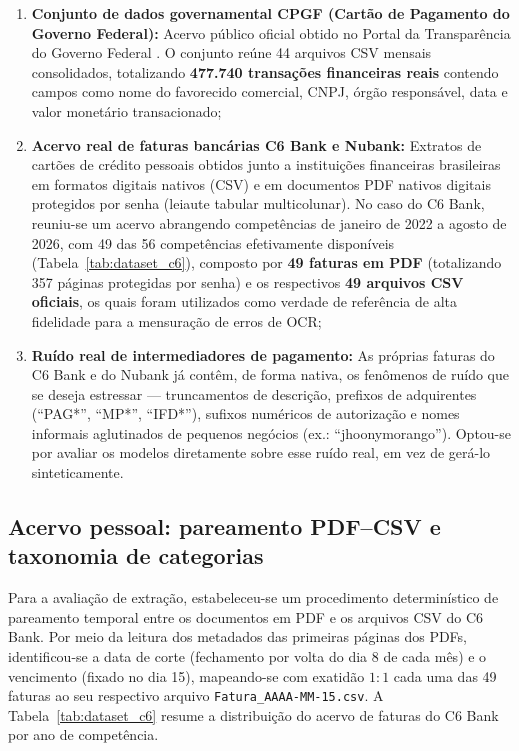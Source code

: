 \begin{enumerate}
	\item \textbf{Conjunto de dados governamental CPGF (Cartão de Pagamento do Governo Federal):} Acervo público oficial obtido no Portal da Transparência do Governo Federal \cite{brasilcpgf}. O conjunto reúne 44 arquivos CSV mensais consolidados, totalizando \textbf{477.740 transações financeiras reais} contendo campos como nome do favorecido comercial, CNPJ, órgão responsável, data e valor monetário transacionado;
	\item \textbf{Acervo real de faturas bancárias C6 Bank e Nubank:} Extratos de cartões de crédito pessoais obtidos junto a instituições financeiras brasileiras em formatos digitais nativos (CSV) e em documentos PDF nativos digitais protegidos por senha (leiaute tabular multicolunar). No caso do C6 Bank, reuniu-se um acervo abrangendo competências de janeiro de 2022 a agosto de 2026, com 49 das 56 competências efetivamente disponíveis (Tabela~\ref{tab:dataset_c6}), composto por \textbf{49 faturas em PDF} (totalizando 357 páginas protegidas por senha) e os respectivos \textbf{49 arquivos CSV oficiais}, os quais foram utilizados como verdade de referência de alta fidelidade para a mensuração de erros de OCR;
	\item \textbf{Ruído real de intermediadores de pagamento:} As próprias faturas do C6 Bank e do Nubank já contêm, de forma nativa, os fenômenos de ruído que se deseja estressar --- truncamentos de descrição, prefixos de adquirentes (``PAG*'', ``MP*'', ``IFD*''), sufixos numéricos de autorização e nomes informais aglutinados de pequenos negócios (ex.: ``jhoonymorango''). Optou-se por avaliar os modelos diretamente sobre esse ruído real, em vez de gerá-lo sinteticamente.
\end{enumerate}

\subsection{Acervo pessoal: pareamento PDF--CSV e taxonomia de categorias}
\label{sec:val_acervo_pessoal}

Para a avaliação de extração, estabeleceu-se um procedimento determinístico de pareamento temporal entre os documentos em PDF e os arquivos CSV do C6 Bank. Por meio da leitura dos metadados das primeiras páginas dos PDFs, identificou-se a data de corte (fechamento por volta do dia 8 de cada mês) e o vencimento (fixado no dia 15), mapeando-se com exatidão $1:1$ cada uma das 49 faturas ao seu respectivo arquivo \texttt{Fatura\_AAAA-MM-15.csv}. A Tabela~\ref{tab:dataset_c6} resume a distribuição do acervo de faturas do C6 Bank por ano de competência.

